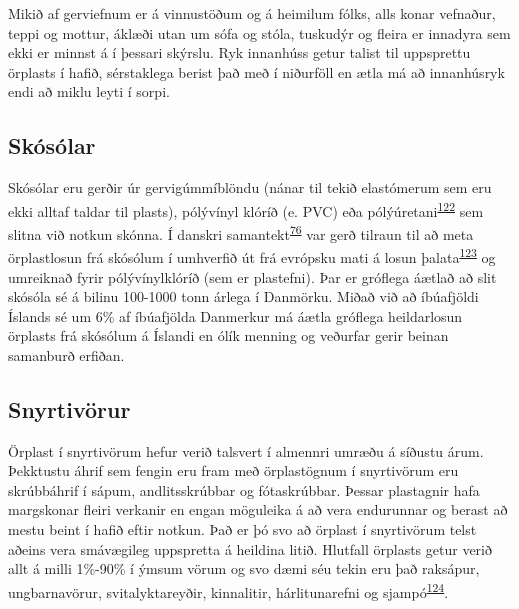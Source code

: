 \documentclass[icelandic,]{book}
\begin{document}
Mikið af gerviefnum er á vinnustöðum og á heimilum fólks, alls konar vefnaður, teppi og mottur, áklæði utan um sófa og stóla, tuskudýr og fleira er innadyra sem ekki er minnst á í þessari skýrslu. Ryk innanhúss getur talist til uppsprettu örplasts í hafið, sérstaklega berist það með í niðurföll en ætla má að innanhúsryk endi að miklu leyti í sorpi.

\hypertarget{skosolar}{%
\subsection*{Skósólar}\label{skosolar}}

Skósólar eru gerðir úr gervigúmmíblöndu (nánar til tekið elastómerum sem eru ekki alltaf taldar til plasts), pólývínyl klóríð (e. PVC) eða pólýúretani\textsuperscript{\protect\hyperlink{ref-karak2009fundamentals}{122}} sem slitna við notkun skónna. Í danskri samantekt\textsuperscript{\protect\hyperlink{ref-lassen2015microplastics}{76}} var gerð tilraun til að meta örplastlosun frá skósólum í umhverfið út frá evrópsku mati á losun þalata\textsuperscript{\protect\hyperlink{ref-Pakalin2008}{123}} og umreiknað fyrir pólývínylklóríð (sem er plastefni). Þar er gróflega áætlað að slit skósóla sé á bilinu 100-1000 tonn árlega í Danmörku. Miðað við að íbúafjöldi Íslands sé um 6\% af íbúafjölda Danmerkur má áætla gróflega heildarlosun örplasts frá skósólum á Íslandi en ólík menning og veðurfar gerir beinan samanburð erfiðan.

\hypertarget{snyrtivorur}{%
\subsection*{Snyrtivörur}\label{snyrtivorur}}

Örplast í snyrtivörum hefur verið talsvert í almennri umræðu á síðustu árum. Þekktustu áhrif sem fengin eru fram með örplastögnum í snyrtivörum eru skrúbbáhrif í sápum, andlitsskrúbbar og fótaskrúbbar. Þessar plastagnir hafa margskonar fleiri verkanir en engan möguleika á að vera endurunnar og berast að mestu beint í hafið eftir notkun. Það er þó svo að örplast í snyrtivörum telst aðeins vera smávægileg uppspretta á heildina litið.
Hlutfall örplasts getur verið allt á milli 1\%-90\% í ýmsum vörum og svo dæmi séu tekin eru það raksápur, ungbarnavörur, svitalyktareyðir, kinnalitir, hárlitunarefni og sjampó\textsuperscript{\protect\hyperlink{ref-Leslie2014}{124}}.
\end{document}
